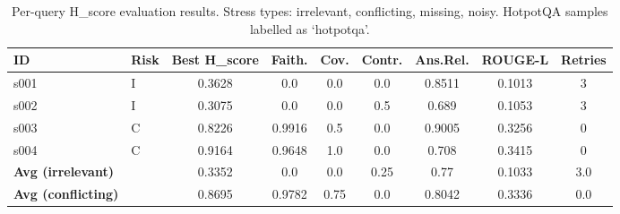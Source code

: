 \begin{table}[h]
\centering
\caption{Per-query H\_score evaluation results. Stress types: irrelevant, conflicting, missing, noisy. HotpotQA samples labelled as `hotpotqa'.}
\label{tab:hscore_results}
\begin{tabular}{llccccccc}
\hline
\textbf{ID} & \textbf{Risk} & \textbf{Best H\_score} & \textbf{Faith.} & \textbf{Cov.} & \textbf{Contr.} & \textbf{Ans.Rel.} & \textbf{ROUGE-L} & \textbf{Retries} \\
\hline
s001 & I & 0.3628 & 0.0 & 0.0 & 0.0 & 0.8511 & 0.1013 & 3 \\
s002 & I & 0.3075 & 0.0 & 0.0 & 0.5 & 0.689 & 0.1053 & 3 \\
s003 & C & 0.8226 & 0.9916 & 0.5 & 0.0 & 0.9005 & 0.3256 & 0 \\
s004 & C & 0.9164 & 0.9648 & 1.0 & 0.0 & 0.708 & 0.3415 & 0 \\
\hline
\textbf{Avg (irrelevant)} & & 0.3352 & 0.0 & 0.0 & 0.25 & 0.77 & 0.1033 & 3.0 \\
\textbf{Avg (conflicting)} & & 0.8695 & 0.9782 & 0.75 & 0.0 & 0.8042 & 0.3336 & 0.0 \\
\hline
\end{tabular}
\end{table}